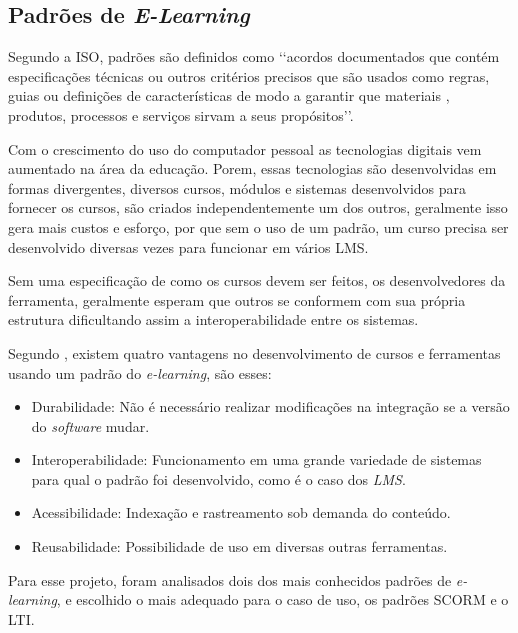 \subsection{Padrões de \textit{E-Learning}}
Segundo a ISO, padrões são definidos como \lq\lq acordos documentados que contém especificações técnicas ou outros critérios precisos que são usados como regras, guias ou definições de características de modo a garantir que materiais , produtos, processos e serviços sirvam a seus propósitos\rq\rq.
\par
Com o crescimento do uso do computador pessoal as tecnologias digitais vem aumentado na área da educação. Porem, essas tecnologias são desenvolvidas em formas divergentes, diversos cursos, módulos e sistemas desenvolvidos para fornecer os cursos, são criados independentemente um dos outros, geralmente isso gera mais custos e esforço, por que sem o uso de um padrão, um curso precisa ser desenvolvido diversas vezes para funcionar em vários \ac{LMS}.
\par 
Sem uma especificação de como os cursos devem ser feitos, os desenvolvedores da ferramenta, geralmente esperam que outros se conformem com sua própria estrutura dificultando assim a interoperabilidade entre os sistemas.
\par
Segundo , existem quatro vantagens no desenvolvimento de cursos e ferramentas usando um padrão do \textit{e-learning}, são esses:
\begin{itemize}
  \item Durabilidade: Não é necessário realizar modificações na integração se a versão do \textit{software} mudar.
  \item Interoperabilidade: Funcionamento em uma grande variedade de sistemas para qual o padrão foi desenvolvido, como é o caso dos \textit{LMS}.
  \item Acessibilidade: Indexação e rastreamento sob demanda do conteúdo.
  \item Reusabilidade: Possibilidade de uso em diversas outras ferramentas.
\end{itemize}
\par
Para esse projeto, foram analisados dois dos mais conhecidos padrões de \textit{e-learning}, e escolhido o mais adequado para o caso de uso, os padrões \ac{SCORM} e o \ac{LTI}.

